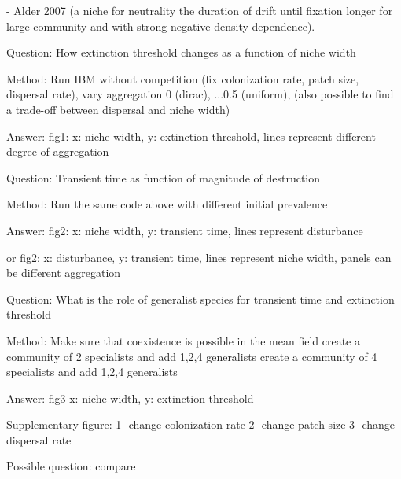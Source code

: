 
- Alder 2007 (a niche for neutrality the duration of drift until fixation  longer	 for large community and with strong negative density dependence). 

Question:
How extinction threshold changes as a function of niche width

Method:
Run IBM without competition (fix colonization rate, patch size, dispersal rate), vary aggregation 0 (dirac), ...0.5 (uniform), (also possible to find a trade-off between dispersal and niche width)

Answer:
fig1: x: niche width, y: extinction threshold, lines represent different degree of aggregation

Question:
Transient time as function of  magnitude of destruction

Method:
Run the same code above with different initial prevalence

Answer:
fig2: x: niche width, y: transient time, lines represent disturbance

or 
fig2: x: disturbance, y: transient time, lines represent niche width, panels can be different aggregation

Question:
What is the role of generalist species for transient time and extinction threshold

Method:
Make sure that coexistence is possible in the mean field
create a community of 2 specialists and add  1,2,4 generalists
create a community of 4 specialists and add 1,2,4 generalists

Answer:
fig3 x: niche width, y: extinction threshold 
  
  
Supplementary figure:
1- change colonization rate
2- change patch size
3- change dispersal rate  
  
Possible question: compare   
